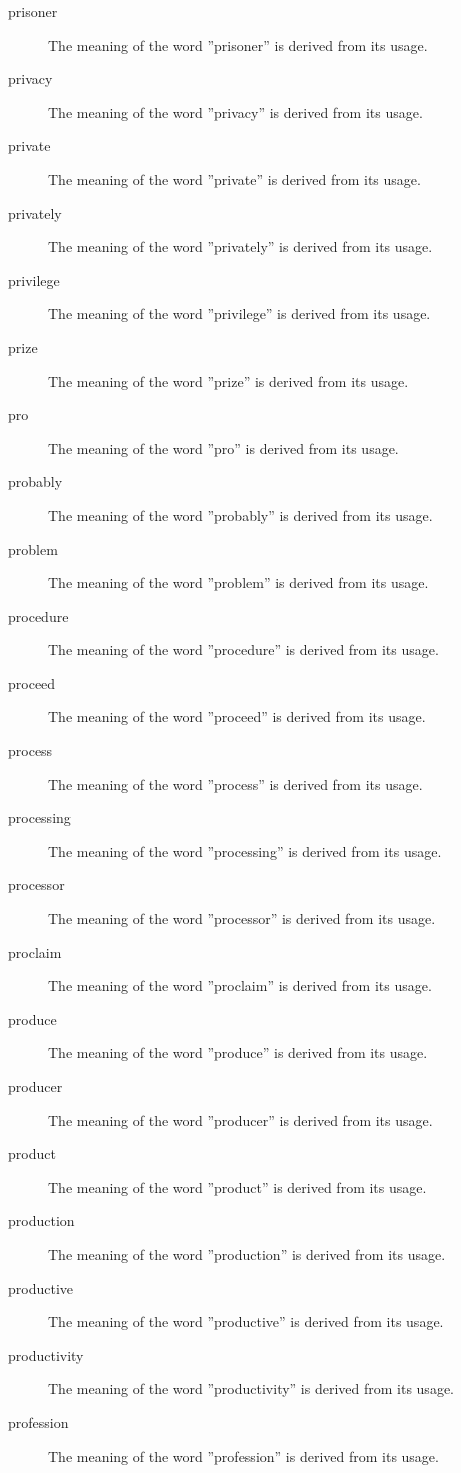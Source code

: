 \documentclass[12pt, letterpaper]{memoir}
\begin{document}
\begin{description}
\item[prisoner] The meaning of the word ''prisoner'' is derived from its usage.
\item[privacy] The meaning of the word ''privacy'' is derived from its usage.
\item[private] The meaning of the word ''private'' is derived from its usage.
\item[privately] The meaning of the word ''privately'' is derived from its usage.
\item[privilege] The meaning of the word ''privilege'' is derived from its usage.
\item[prize] The meaning of the word ''prize'' is derived from its usage.
\item[pro] The meaning of the word ''pro'' is derived from its usage.
\item[probably] The meaning of the word ''probably'' is derived from its usage.
\item[problem] The meaning of the word ''problem'' is derived from its usage.
\item[procedure] The meaning of the word ''procedure'' is derived from its usage.
\item[proceed] The meaning of the word ''proceed'' is derived from its usage.
\item[process] The meaning of the word ''process'' is derived from its usage.
\item[processing] The meaning of the word ''processing'' is derived from its usage.
\item[processor] The meaning of the word ''processor'' is derived from its usage.
\item[proclaim] The meaning of the word ''proclaim'' is derived from its usage.
\item[produce] The meaning of the word ''produce'' is derived from its usage.
\item[producer] The meaning of the word ''producer'' is derived from its usage.
\item[product] The meaning of the word ''product'' is derived from its usage.
\item[production] The meaning of the word ''production'' is derived from its usage.
\item[productive] The meaning of the word ''productive'' is derived from its usage.
\item[productivity] The meaning of the word ''productivity'' is derived from its usage.
\item[profession] The meaning of the word ''profession'' is derived from its usage.

\end{description}
\end{document}

